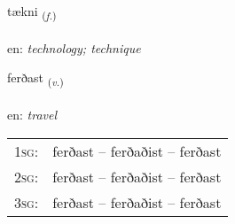 \documentclass[frontgrid, backgrid]{flacards}\usepackage[]{graphicx}\usepackage[]{color}
\begin{document}
\renewcommand{\flhead}{\vskip5pt \fboxsep=0pt {\small\bfseries\footnotesize Nafnorð | Noun}}
\renewcommand{\fcfoot}{\vskip5pt \fboxsep=0pt \hspace{2pt}{\small\bfseries\footnotesize 2K}}

\renewcommand{\blhead}{\vskip5pt {\small\bfseries\footnotesize Nafnorð | Noun }}
\renewcommand{\bcfoot}{\vskip5pt \hspace{2pt}{\small\bfseries\footnotesize 2K}}


{tækni \small{\textsubscript{(\textit{f.})}} \\[1ex] %
\textphonetic{[tʰaihknɪ]} \\
en: \emph{technology; technique} \\  [2ex]
\renewcommand*{\arraystretch}{0.8}
}

\renewcommand{\flhead}{\vskip5pt \fboxsep=0pt {\small\bfseries\footnotesize Sagnorð | Verb}}
\renewcommand{\fcfoot}{\vskip5pt \fboxsep=0pt \hspace{2pt}{\small\bfseries\footnotesize 2K}}

\renewcommand{\blhead}{\vskip5pt {\small\bfseries\footnotesize Sagnorð | Verb }}
\renewcommand{\bcfoot}{\vskip5pt \hspace{2pt}{\small\bfseries\footnotesize 2K}}


{ferðast \small{\textsubscript{(\textit{v.})}} \\[1ex] %
\textphonetic{[fɛrðast]} \\
en: \emph{travel} \\  [2ex]
\renewcommand*{\arraystretch}{0.8}
\begin{tabular}{p{1cm}l}
\textsc{1sg}: & ferðast -- ferðaðist -- ferðast \\ 
\textsc{2sg}: & ferðast -- ferðaðist -- ferðast \\ 
\textsc{3sg}: & ferðast -- ferðaðist -- ferðast \\ 
\end{tabular}
}
\end{document}
